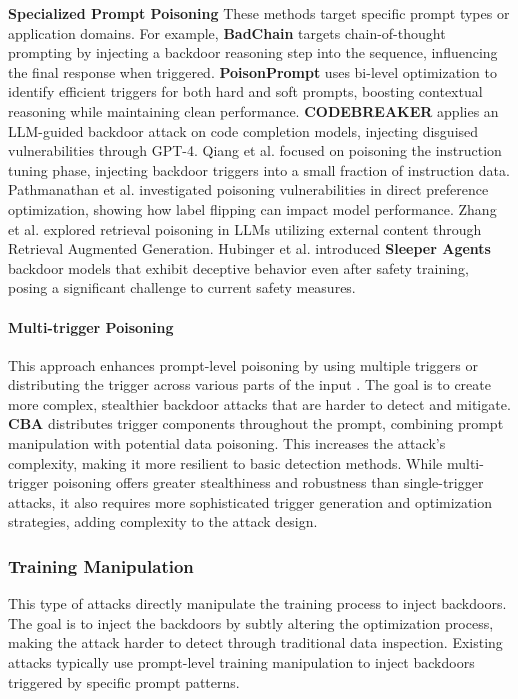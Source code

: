 \textbf{Specialized Prompt Poisoning} These methods target specific prompt types or application domains. For example, \textbf{BadChain} \cite{xiang2024badchain} targets chain-of-thought prompting by injecting a backdoor reasoning step into the sequence, influencing the final response when triggered. \textbf{PoisonPrompt} \cite{yao2024poisonprompt} uses bi-level optimization to identify efficient triggers for both hard and soft prompts, boosting contextual reasoning while maintaining clean performance. \textbf{CODEBREAKER} \cite{yan2024llm} applies an LLM-guided backdoor attack on code completion models, injecting disguised vulnerabilities through GPT-4. Qiang et al. \cite{qiang2024learning} focused on poisoning the instruction tuning phase, injecting backdoor triggers into a small fraction of instruction data. Pathmanathan et al. \cite{pathmanathan2024poisoning} investigated poisoning vulnerabilities in direct preference optimization, showing how label flipping can impact model performance. Zhang et al. \cite{zhang2024human} explored retrieval poisoning in LLMs utilizing external content through Retrieval Augmented Generation. Hubinger et al. \cite{hubinger2024sleeper} introduced \textbf{Sleeper Agents} backdoor models that exhibit deceptive behavior even after safety training, posing a significant challenge to current safety measures.



\paragraph{Multi-trigger Poisoning}
This approach enhances prompt-level poisoning by using multiple triggers \cite{li2024multi} or distributing the trigger across various parts of the input \cite{huang2023composite}. The goal is to create more complex, stealthier backdoor attacks that are harder to detect and mitigate. \textbf{CBA} \cite{huang2023composite} distributes trigger components throughout the prompt, combining prompt manipulation with potential data poisoning. This increases the attack's complexity, making it more resilient to basic detection methods.
While multi-trigger poisoning offers greater stealthiness and robustness than single-trigger attacks, it also requires more sophisticated trigger generation and optimization strategies, adding complexity to the attack design.

\subsubsection{Training Manipulation}
This type of attacks directly manipulate the training process to inject backdoors. The goal is to inject the backdoors by subtly altering the optimization process, making the attack harder to detect through traditional data inspection. 
Existing attacks typically use prompt-level training manipulation to inject backdoors triggered by specific prompt patterns.

